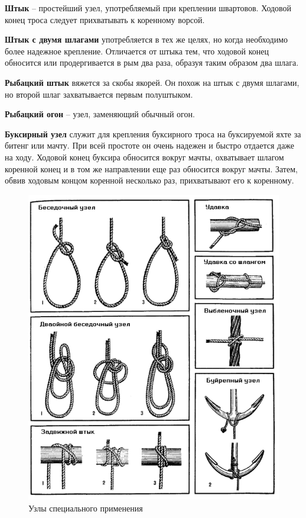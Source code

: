 \documentclass[a4paper, 12pt, twoside, final]{scrbook}
\begin{document}
\textbf{Штык} \--- простейший узел, употребляемый при креплении швартовов. Ходовой конец троса следует прихватывать к коренному ворсой.

\textbf{Штык с двумя шлагами} употребляется в тех же целях, но когда необходимо более надежное крепление. Отличается от штыка тем, что ходовой конец обносится или продергивается в рым два раза, образуя таким образом два шлага.

\textbf{Рыбацкий штык} вяжется за скобы якорей. Он похож на штык с двумя шлагами, но второй шлаг захватывается первым полуштыком.

\textbf{Рыбацкий огон} \--- узел, заменяющий обычный огон.

\textbf{Буксирный узел} служит для крепления буксирного троса на буксируемой яхте за битенг или мачту. При всей простоте он очень надежен и быстро отдается даже на ходу. Ходовой конец буксира обносится вокруг мачты, охватывает шлагом коренной конец и в том же направлении еще раз обносится вокруг мачты. Затем, обвив ходовым концом коренной несколько раз, прихватывают его к коренному.

\begin{figure}[htbp]
   \centering
   \includegraphics{61_Uzly} %
   \caption{Узлы специального применения}
   \label{fig:61}
\end{figure}
\end{document}
